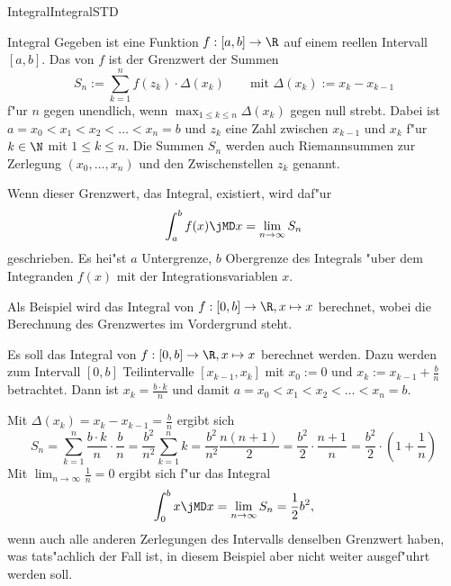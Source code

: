 \begin{MXContent}{Integral}{Integral}{STD}
\begin{MXInfo}{Integral} 
Gegeben ist eine Funktion $f: [a, b] \rightarrow \R$ auf einem reellen Intervall
$[a, b]$. 
Das  von $f$ ist der Grenzwert
der Summen
\begin{equation}
S_n := \sum_{k=1}^n f(z_k) \cdot \Delta(x_k) %
\qquad \text{mit } \Delta(x_k) := x_k - x_{k-1} %
\end{equation}
f"ur $n$ gegen unendlich, wenn $\max_{1 \leq k \leq n} \Delta(x_k)$ gegen null 
strebt.
Dabei ist $a = x_0 < x_1 < x_2 < \ldots < x_n = b$ und $z_k$ eine Zahl 
zwischen $x_{k-1}$ und $x_k$ f"ur $k \in \N$ mit $1 \leq k \leq n$. 
Die Summen $S_n$ werden auch Riemannsummen zur Zerlegung $(x_0, \ldots, x_n)$ 
und den Zwischenstellen $z_k$ genannt.

Wenn dieser Grenzwert, das Integral, existiert, wird daf"ur
\begin{equation}
\int_a^b f(x) \jMD x = \lim_{n \rightarrow \infty} S_n %
\end{equation}
geschrieben. Es hei"st $a$ Untergrenze, $b$ Obergrenze des Integrals "uber dem
Integranden $f(x)$ mit der Integrationsvariablen $x$.
\end{MXInfo}

Als Beispiel wird das Integral von $f: [0, b] \rightarrow \R, x \mapsto x$ 
berechnet, 
wobei die Berechnung des Grenzwertes im Vordergrund steht.

\begin{MExample}
Es soll das Integral von $f: [0, b] \rightarrow \R, x \mapsto x$ berechnet werden.
Dazu werden zum Intervall $[0, b]$ Teilintervalle $[x_{k-1}, x_k]$ mit 
$x_0 := 0$ und $x_k := x_{k-1} + \frac{b}{n}$ betrachtet. Dann ist 
$x_k = \frac{b \cdot k}{n}$ und damit 
$a = x_0 < x_1 < x_2 < \ldots < x_n = b$.

Mit $\Delta(x_k) = x_k - x_{k-1} = \frac{b}{n}$ ergibt sich
\[
S_n = \sum_{k=1}^{n} \frac{b \cdot k}{n} \cdot \frac{b}{n} %
 = \frac{b^2}{n^2} \sum_{k=1}^{n} k %
 = \frac{b^2}{n^2} \frac{n (n+1)}{2} %
 = \frac{b^2}{2} \cdot \frac{n+1}{n} %
 = \frac{b^2}{2} \cdot \left(1 + \frac{1}{n}\right) %
\]
Mit $\displaystyle\lim_{n \rightarrow \infty} \frac{1}{n} = 0$ ergibt sich f"ur 
das Integral
\[
\int_0^b x \jMD x = \lim_{n \rightarrow \infty} S_n =  \frac{1}{2} b^2, %
\]
wenn auch alle anderen Zerlegungen des Intervalls denselben Grenzwert haben,
was tats"achlich der Fall ist, in diesem Beispiel aber nicht weiter ausgef"uhrt 
werden soll. 
\end{MExample}


\end{MXContent}
